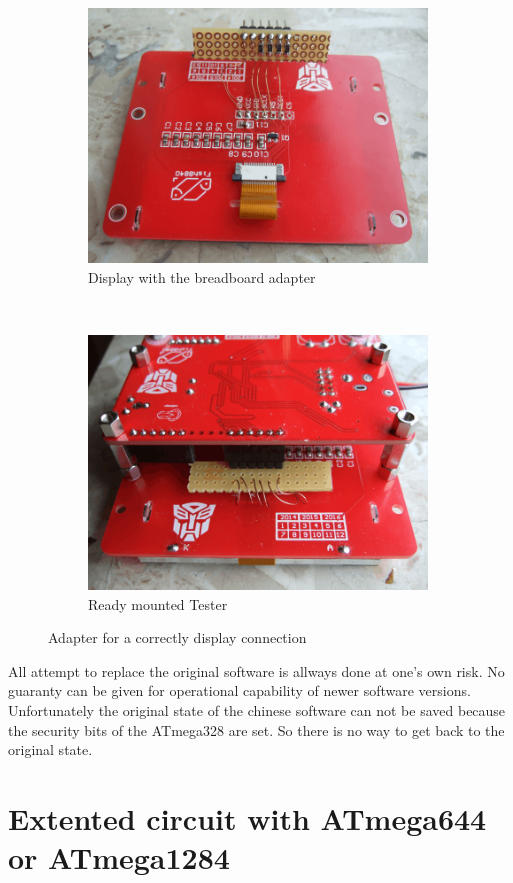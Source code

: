 \begin{figure}[H]
  \begin{subfigure}[b]{9cm}
    \centering
    \includegraphics[width=9cm]{../PNG/Fish8840Adapt1.png}
    \caption{Display with the breadboard adapter}
  \end{subfigure}
  ~
  \begin{subfigure}[b]{9cm}
    \centering
    \includegraphics[width=9cm]{../PNG/Fish8840Adapt2.png}
    \caption{Ready mounted Tester}
  \end{subfigure}
  \caption{Adapter for a correctly display connection}
  \label{fig:Fish8840Adapt}
\end{figure}

All attempt to replace the original software is allways done at one's own risk.
No guaranty can be given for operational capability of newer software versions.
Unfortunately the original state of the chinese software can not be saved because the 
security bits of the ATmega328 are set. So there is no way to get back to the original state.

\section{Extented circuit with ATmega644 or ATmega1284}

